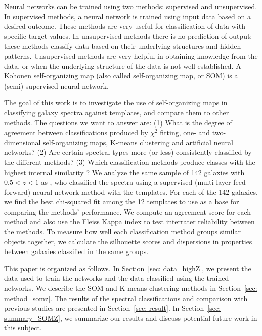 Neural networks can be trained using two methods: supervised and unsupervised.
In supervised methods, a neural network is trained using input data based on a desired outcome.
These methods are very useful for classification of data with specific target values.
In unsupervised methods there is no prediction of output:
these methods classify data based on their underlying structures and hidden patterns.
Unsupervised methods are very helpful in obtaining knowledge from the data, or when the underlying structure of the data is not well established.
A Kohonen self-organizing map (also called self-organizing map, or SOM) is a (semi)-supervised neural network.


The goal of this work is to investigate the use of self-organizing maps in classifying galaxy spectra against templates, and compare them to other methods. 
The questions we want to answer are: 
(1) What is the degree of agreement between classifications produced by $\chi^2$ fitting, one- and two-dimensional self-organizing maps, K-means clustering and artificial neural networks? 
(2) Are certain spectral types more (or less) consistently classified by the different methods? 
(3) Which classification methods produce classes with the highest internal similarity ?
We analyze the same sample of 142 galaxies with $0.5 < z < 1$ as 
\citet[][hereafter ]{Hossein12}, who classified the spectra using a supervised (multi-layer feed-forward) neural network method with the  templates.
For each of the 142 galaxies, we find the best chi-squared fit among the 12 templates to use as a base for comparing the methods' performance.
We compute an agreement score for each method and also use the Fleiss Kappa index \citet{Fleiss71} to test interrater reliability 
between the methods.
To measure how well each classification method groups similar objects together, we
calculate the silhouette scores and dispersions in properties between galaxies classified in the same groups.


This paper is organized as follows.
In Section~\ref{sec: data_highZ}, we present the data used to train the networks and the data classified using the trained networks. 
We describe the SOM and K-means clustering methods in Section~\ref{sec: method_somz}. 
The results of the spectral classifications and comparison with previous studies are presented in Section~\ref{sec: result}. 
In Section~\ref{sec: summary_SOMZ}, we summarize our results and discuss potential future work in this subject.